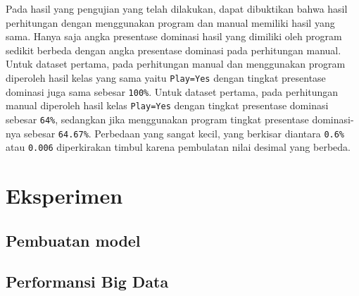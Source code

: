 Pada hasil yang pengujian yang telah dilakukan, dapat dibuktikan bahwa hasil perhitungan dengan menggunakan program dan manual memiliki hasil yang sama. Hanya saja angka presentase dominasi hasil yang dimiliki oleh program sedikit berbeda dengan angka presentase dominasi pada perhitungan manual. Untuk dataset pertama, pada perhitungan manual dan menggunakan program diperoleh hasil kelas yang sama yaitu \texttt{Play=Yes} dengan tingkat presentase dominasi juga sama sebesar \texttt{100\%}. Untuk dataset pertama, pada perhitungan manual diperoleh hasil kelas \texttt{Play=Yes} dengan tingkat presentase dominasi sebesar \texttt{64\%}, sedangkan jika menggunakan program tingkat presentase dominasi-nya sebesar \texttt{64.67\%}. Perbedaan yang sangat kecil, yang berkisar diantara \texttt{0.6\%} atau \texttt{0.006} diperkirakan timbul karena pembulatan nilai desimal yang berbeda.

\section{Eksperimen}

\subsection{Pembuatan model}

\subsection{Performansi Big Data}